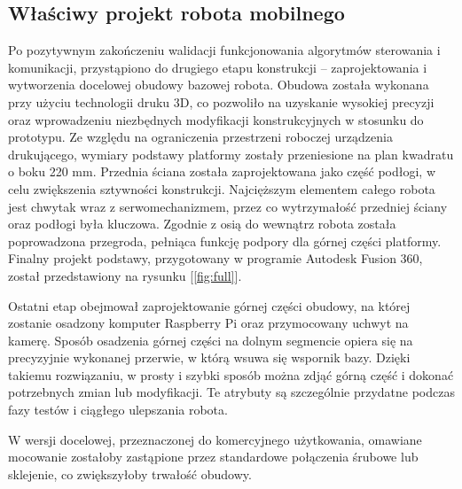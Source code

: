 

\subsection{Właściwy projekt robota mobilnego}

Po pozytywnym zakończeniu walidacji funkcjonowania algorytmów sterowania i komunikacji, przystąpiono do drugiego etapu konstrukcji – zaprojektowania i wytworzenia docelowej obudowy bazowej robota. Obudowa została wykonana przy użyciu technologii druku 3D, co pozwoliło na uzyskanie wysokiej precyzji oraz wprowadzeniu niezbędnych modyfikacji konstrukcyjnych w stosunku do prototypu. Ze względu na ograniczenia przestrzeni roboczej urządzenia drukującego, wymiary podstawy platformy zostały przeniesione na plan kwadratu o boku 220 mm.
Przednia ściana została zaprojektowana jako część podłogi, w celu zwiększenia sztywności konstrukcji. Najcięższym elementem całego robota jest chwytak wraz z serwomechanizmem, przez co wytrzymałość przedniej ściany oraz podłogi była kluczowa. Zgodnie z osią do wewnątrz robota została poprowadzona przegroda, pełniąca funkcję podpory dla górnej części platformy.
Finalny projekt podstawy, przygotowany w programie Autodesk Fusion 360, został przedstawiony na rysunku [\ref{fig:full}].

\hspace{1cm} 

Ostatni etap obejmował zaprojektowanie górnej części obudowy, na której zostanie osadzony komputer Raspberry Pi oraz przymocowany uchwyt na kamerę. Sposób osadzenia górnej części na dolnym segmencie opiera się na precyzyjnie wykonanej przerwie, w którą wsuwa się wspornik bazy. Dzięki takiemu rozwiązaniu, w prosty i szybki sposób można zdjąć górną część i dokonać potrzebnych zmian lub modyfikacji. Te atrybuty są szczególnie przydatne podczas fazy testów i ciągłego ulepszania robota.

W wersji docelowej, przeznaczonej do komercyjnego użytkowania, omawiane mocowanie zostałoby zastąpione przez standardowe połączenia śrubowe lub sklejenie, co zwiększyłoby trwałość obudowy.


